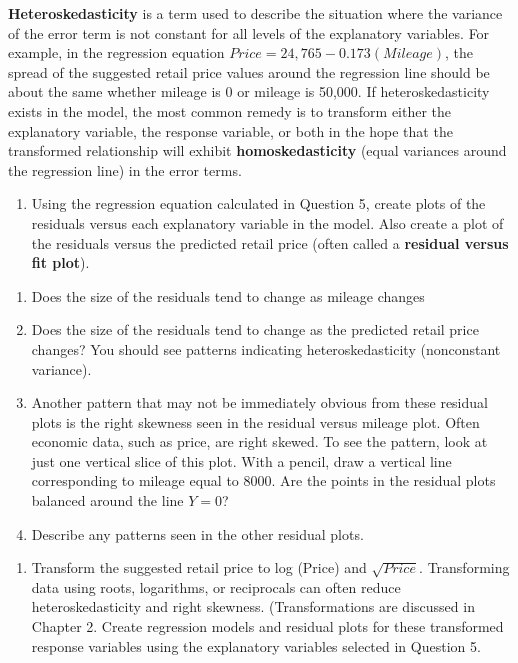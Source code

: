 \documentclass[
]{book}
\providecommand{\tightlist}{%
  \setlength{\itemsep}{0pt}\setlength{\parskip}{0pt}}
\begin{document}
\textbf{Heteroskedasticity} is a term used to describe the situation where the variance of the error term is not constant for all levels of the explanatory variables. For example, in the regression equation \(Price = 24,765 - 0.173 (Mileage)\), the spread of the suggested retail price values around the regression line should be about the same whether mileage is 0 or mileage is 50,000. If heteroskedasticity exists in the model, the most common remedy is to transform either the explanatory variable, the response variable, or both in the hope that the transformed relationship will exhibit \textbf{homoskedasticity} (equal variances around the regression line) in the error terms.

\begin{enumerate}
\def\labelenumi{\arabic{enumi}.}
\setcounter{enumi}{6}
\tightlist
\item
  Using the regression equation calculated in Question 5, create plots of the residuals versus each explanatory variable in the model. Also create a plot of the residuals versus the predicted retail price (often called a \textbf{residual versus fit plot}).
\end{enumerate}

\begin{enumerate}
\def\labelenumi{\alph{enumi}.}
\item
  Does the size of the residuals tend to change as mileage changes
\item
  Does the size of the residuals tend to change as the predicted retail price changes? You should see patterns indicating heteroskedasticity (nonconstant variance).
\item
  Another pattern that may not be immediately obvious from these residual plots is the right skewness seen in the residual versus mileage plot. Often economic data, such as price, are right skewed. To see the pattern, look at just one vertical slice of this plot. With a pencil, draw a vertical line corresponding to mileage equal to 8000. Are the points in the residual plots balanced around the line \(Y = 0\)?
\item
  Describe any patterns seen in the other residual plots.
\end{enumerate}

\begin{enumerate}
\def\labelenumi{\arabic{enumi}.}
\setcounter{enumi}{7}
\tightlist
\item
  Transform the suggested retail price to log (Price) and \(\sqrt{Price}\). Transforming data using roots, logarithms, or reciprocals can often reduce heteroskedasticity and right skewness. (Transformations are discussed in Chapter 2. Create regression models and residual plots for these transformed response variables using the explanatory variables selected in Question 5.
\end{enumerate}
\end{document}
